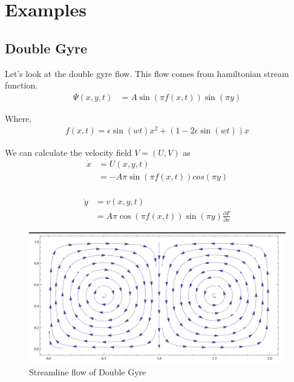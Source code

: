 \documentclass[../report.tex]{subfiles}
\begin{document}
\chapter{Examples}

\section{Double Gyre}
Let's look at the double gyre flow. This flow comes from hamiltonian stream function.
\begin{equation}
  \begin{aligned}
    \Psi(x, y, t) &= A\sin(\pi f(x, t)) \sin(\pi y)
  \end{aligned}
\end{equation}

Where,
\begin{equation}
  \begin{aligned}
    f(x, t) = \epsilon\sin(wt) x^2 + (1 - 2 \epsilon \sin(wt))x
  \end{aligned}
\end{equation}

We can calculate the velocity field \(V = (U, V)\) as
\begin{equation}
  \begin{aligned}
    \dot x &= U(x, y, t) \\
    &= -A\pi\sin(\pi f(x, t)) cos(\pi y) \\
  \end{aligned}
\end{equation}

\begin{equation}
  \begin{aligned}
    \dot y &= v(x, y, t) \\
    &= A\pi\cos(\pi f(x, t)) \sin(\pi y) \frac{\partial F}{\partial x}
  \end{aligned}
\end{equation}

\begin{figure}[H]
  \centering
  \includegraphics[width=0.8\linewidth]{images/image_2.png}
  \caption{Streamline flow of Double Gyre}
  \label{figg:fig_2}
\end{figure}
\end{document}
